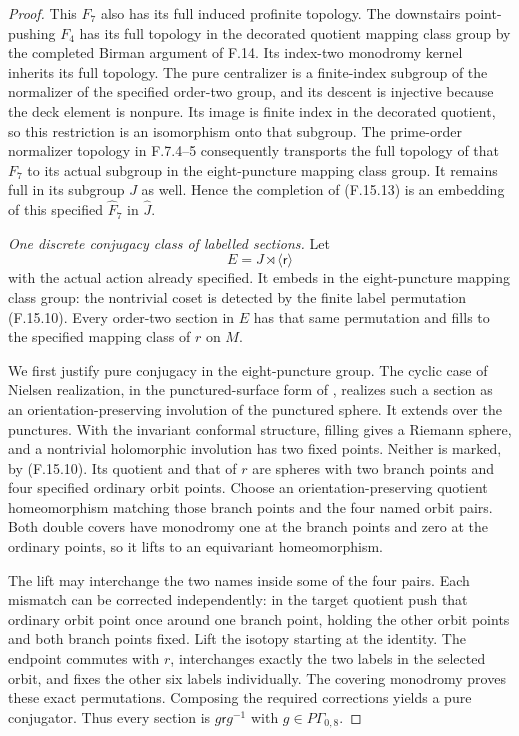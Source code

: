 \begin{proof}
This $F_7$ also has its full induced profinite topology.
The downstairs point-pushing $F_4$ has its full topology
in the decorated quotient mapping class group by the
completed Birman argument of F.14.  Its index-two
monodromy kernel inherits its full topology.
The pure centralizer is a finite-index subgroup of the
normalizer of the specified order-two group, and its
descent is injective because the deck element is
nonpure.  Its image is finite index in the decorated
quotient, so this restriction is an isomorphism onto
that subgroup.  The prime-order normalizer topology in
F.7.4--5 consequently transports the full topology of
that $F_7$ to its actual subgroup in the eight-puncture
mapping class group.  It remains full in its subgroup
$J$ as well.  Hence the completion of (F.15.13)
is an embedding of this specified $\widehat F_7$ in
$\widehat J$.

\emph{One discrete conjugacy class of labelled sections.}
Let
\[
                       E=J\rtimes\langle\mathsf r\rangle
                                                               \tag{F.15.14}
\]
with the actual action already specified.
It embeds in the eight-puncture mapping class group:
the nontrivial coset is detected by the finite label
permutation (F.15.10).
Every order-two section in $E$ has that same permutation
and fills to the specified mapping class of $r$ on $M$.

We first justify pure conjugacy in the eight-puncture
group.  The cyclic case of Nielsen realization, in
the punctured-surface form of
\cite[Theorem 4 and Section IV, pp.~255--256]{bKerckhoff1983},
realizes such a section as an orientation-preserving
involution of the punctured sphere.  It extends over
the punctures.  With the invariant conformal structure,
filling gives a Riemann sphere, and a nontrivial
holomorphic involution has two fixed points.
Neither is marked, by (F.15.10).
Its quotient and that of $r$ are spheres with two
branch points and four specified ordinary orbit
points.  Choose an orientation-preserving quotient
homeomorphism matching those branch points and the
four named orbit pairs.  Both double covers have
monodromy one at the branch points and zero at the
ordinary points, so it lifts to an equivariant
homeomorphism.

The lift may interchange the two names inside some
of the four pairs.  Each mismatch can be corrected
independently: in the target quotient push that
ordinary orbit point once around one branch point,
holding the other orbit points and both branch points
fixed.  Lift the isotopy starting at the identity.
The endpoint commutes with $r$, interchanges exactly
the two labels in the selected orbit, and fixes the
other six labels individually.  The covering
monodromy proves these exact permutations.
Composing the required corrections yields a pure
conjugator.  Thus every section is $g\mathsf r g^{-1}$
with $g\in P\Gamma_{0,8}$.


\end{proof}
